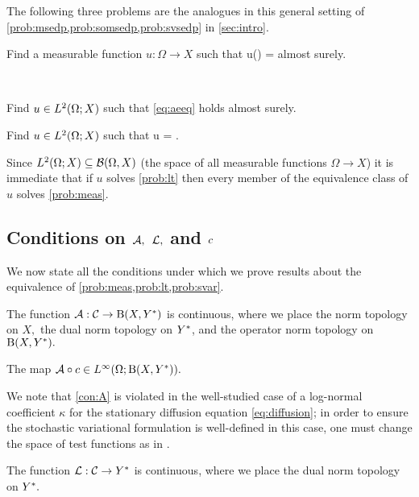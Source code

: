 The following three problems are the analogues in this general setting of \cref{prob:msedp,prob:somsedp,prob:svsedp} in \cref{sec:intro}.

\label{prob:meas}
Find a measurable function $u:\Omega \rightarrow X$ such that 
\beq\label{eq:aeeq}
\Acomega u(\omega) = \Lcomega \tin \Ys
\eeq
almost surely.
\eprobvar

\label{prob:lt}

\

Find $u \in \LtOX$ such that \eqref{eq:aeeq} holds almost surely.
\eprobvar

\label{prob:svar}
Find $u \in \LtOX$ such that
\beq\label{eq:stoeq}
\SAc u = \SLc \tin \LtOYas.
\eeq
\eprobvar

\label{rem:imm}
Since $\LtOX \subseteq \BorelOX$ (the space of all measurable functions $\Omega\rightarrow X$)
it is immediate that if $u$ solves \cref{prob:lt} then every member of the equivalence class of $u$ solves \cref{prob:meas}.
\ere

\subsection{Conditions on $\mathcal A,$ $\mathcal L,$ and $c$}\label{sec:cons}
We now state all the conditions under which we prove results about the equivalence of \cref{prob:meas,prob:lt,prob:svar}.


 \label{con:coeffstoform}
The function $\toform:\cC \rightarrow \homspace$ is continuous, where we place the norm topology on $X,$ the dual norm topology on $Y^{*}$, and the operator norm topology on $\homspace.$
\econvar

\label{con:A}
The map $\toform\circ\coeff \in \LiOhomspace.$
\econvar


We note that \cref{con:A} is violated in the well-studied case of a log-normal coefficient $\kappa$ for the stationary diffusion equation \eqref{eq:diffusion}; in order to ensure the stochastic variational formulation is well-defined in this case, one must change the space of test functions as in \cite{Gi:10,MuSt:11}.

 \label{con:coeffstofunc}
The function $\mathcal L:\mathcal C \rightarrow Y^{*}$  is continuous, where we place the dual norm topology on $Y^{*}.$
\econvar

